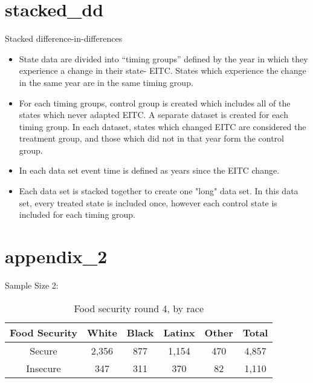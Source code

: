 \documentclass[t, hyperref={colorlinks=true}, compress]{beamer}
\begin{document}
\section{stacked_dd}
\begin{frame}{Stacked difference-in-differences}

\begin{itemize}
\item State data are divided into ``timing groups'' defined by the year in which they experience a change in their state- EITC. States which experience the change in the same year are in the same timing group. 
\item For each timing groups, control group is created which includes all of the states which never adapted EITC. A separate dataset is created for each timing group. In each dataset, states which changed EITC are considered the treatment group, and those which did not in that year form the control group. 
\item  In each data set event time is defined as years since the EITC change. 
\item Each data set is stacked together to create one "long" data set. In this data set, every treated state is included once, however each control state is included for each timing group.
\end{itemize}



\end{frame}

\section{appendix_2}


\begin{frame}{Sample Size 2: } 
\begin{table}[!htbp]\caption{Food security round 4, by race} 
\begin{tabular}{| cccccc |}
\textbf{Food Security} & \textbf{White} & \textbf{Black}&	\textbf{Latinx}&	\textbf{Other} & \textbf{Total} \\
\hline
Secure	& 2,356 &	 877& 1,154 & 470& 4,857 \\
Insecure &	 347 &  311  & 370 &  82  & 1,110\\
\hline
\end{tabular}
\end{table}
\end{frame}
\end{document}
